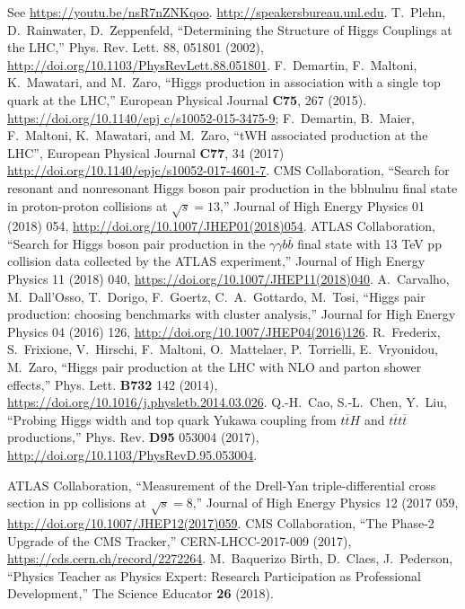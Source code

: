 \begin{thebibliography}{99}
%
 See \url{https://youtu.be/nsR7nZNKqoo}.
%
 \url{http://speakersbureau.unl.edu}.
%
    T.~Plehn, D.~Rainwater, D.~Zeppenfeld, ``Determining the Structure of Higgs Couplings at the LHC,''
    Phys. Rev. Lett. 88, 051801 (2002), \url{http://doi.org/10.1103/PhysRevLett.88.051801}.
%
 F.~Demartin, F.~Maltoni, K.~Mawatari, and M.~Zaro,
  ``Higgs production in association with a single top quark at the LHC,''
  European Physical Journal {\bf C75}, 267
  (2015). \url{https://doi.org/10.1140/epj c/s10052-015-3475-9};
  F.~Demartin, B.~Maier, F.~Maltoni, K.~Mawatari, and M.~Zaro, ``tWH
  associated production at the LHC'', European Physical Journal {\bf C77}, 34 (2017)
  \url{http://doi.org/10.1140/epjc/s10052-017-4601-7}. 
%
%
    CMS Collaboration, ``Search for resonant and nonresonant Higgs boson pair production in the bblnulnu final state in proton-proton collisions at $\sqrt{s} = 13$\TeV,'' 
    Journal of High Energy Physics 01 (2018) 054, \url{http://doi.org/10.1007/JHEP01(2018)054}.
%
    ATLAS Collaboration, ``Search for Higgs boson pair production in the $\gamma\gamma b\overline{b}$ final state with 13 TeV pp collision data collected by the ATLAS experiment,''
    Journal of High Energy Physics 11 (2018) 040, \url{https://doi.org/10.1007/JHEP11(2018)040}.
%
    A.~Carvalho, M.~Dall’Osso, T.~Dorigo, F.~Goertz, C.~A.~Gottardo, M.~Tosi,
    ``Higgs pair production: choosing benchmarks with cluster analysis,''
    Journal for High Energy Physics 04 (2016) 126, \url{http://doi.org/10.1007/JHEP04(2016)126}.
%
%
%
 R.~Frederix, S.~Frixione, V.~Hirschi,
  F.~Maltoni, O.~Mattelaer, P.~Torrielli, E.~Vryonidou, M.~Zaro, ``Higgs
  pair production at the LHC with NLO and parton shower effects,''
  Phys. Lett. {\bf B732} 142 (2014), \url{ https://doi.org/10.1016/j.physletb.2014.03.026}.
    Q.-H.~Cao, S.-L.~Chen, Y.~Liu,
    ``Probing Higgs width and top quark Yukawa coupling from $t\overline{t}H$ and $t\overline{t}t\overline{t}$ productions,''
    Phys. Rev. {\bf D95} 053004 (2017), \url{http://doi.org/10.1103/PhysRevD.95.053004}.

%
    ATLAS Collaboration, ``Measurement of the Drell-Yan triple-differential cross section in pp collisions at $\sqrt{s}=8$\TeV,''
    Journal of High Energy Physics 12 (2017 059, \url{http://doi.org/10.1007/JHEP12(2017)059}.
%
CMS Collaboration, ``The Phase-2 Upgrade of the CMS Tracker,'' CERN-LHCC-2017-009 (2017),
\url{https://cds.cern.ch/record/2272264}.
%
 M.~Baquerizo Birth, D.~Claes, J.~Pederson, ``Physics Teacher as Physics Expert: Research Participation as Professional Development,''  The Science Educator {\bf 26} (2018).
\end{thebibliography}
